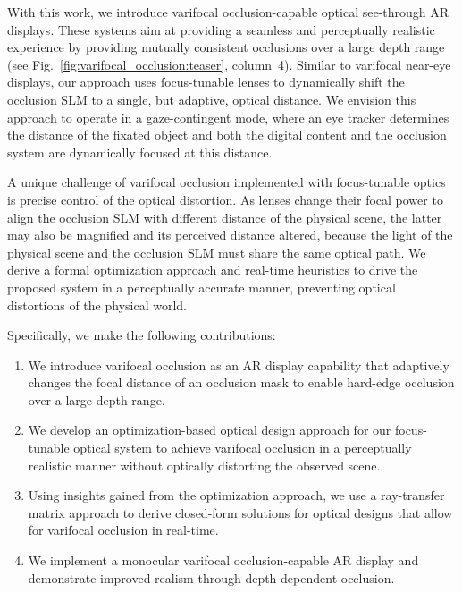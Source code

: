 With this work, we introduce varifocal occlusion-capable optical see-through AR displays. These systems aim at providing a seamless and perceptually realistic experience by providing mutually consistent occlusions over a large depth range (see Fig.~\ref{fig:varifocal_occlusion:teaser}, column~4). Similar to varifocal near-eye displays, our approach uses focus-tunable lenses to dynamically shift the occlusion SLM to a single, but adaptive, optical distance. We envision this approach to operate in a gaze-contingent mode, where an eye tracker determines the distance of the fixated object and both the digital content and the occlusion system are dynamically focused at this distance. 

A unique challenge of varifocal occlusion implemented with focus-tunable optics is precise control of the optical distortion. As lenses change their focal power to align the occlusion SLM with different distance of the physical scene, the latter may also be magnified and its perceived distance altered, because the light of the physical scene and the occlusion SLM must share the same optical path. We derive a formal optimization approach and real-time heuristics to drive the proposed system in a perceptually accurate manner, preventing optical distortions of the physical world. 

Specifically, we make the following contributions:
%
\begin{enumerate}
\item We introduce varifocal occlusion as an AR display capability that adaptively changes the focal distance of an occlusion mask to enable hard-edge occlusion over a large depth range. 
\item  We develop an optimization-based optical design approach for our focus-tunable optical system to achieve varifocal occlusion in a perceptually realistic manner without optically distorting the observed scene. 
\item Using insights gained from the optimization approach, we use a ray-transfer matrix approach to derive closed-form solutions for optical designs that allow for varifocal occlusion in real-time.
\item We implement a monocular varifocal occlusion-capable AR display and demonstrate improved realism through depth-dependent occlusion.
\end{enumerate}



